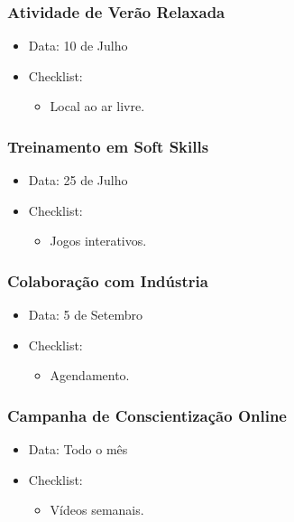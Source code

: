\documentclass[12pt]{article}
\begin{document}
\subsubsection{Atividade de Verão Relaxada}
\begin{itemize}
    \item Data: 10 de Julho
    \item Checklist:
      \begin{itemize}
        \item Local ao ar livre.
      \end{itemize}
\end{itemize}

\subsubsection{Treinamento em Soft Skills}
\begin{itemize}
    \item Data: 25 de Julho
    \item Checklist:
      \begin{itemize}
        \item Jogos interativos.
      \end{itemize}
\end{itemize}

\subsubsection{Colaboração com Indústria}
\begin{itemize}
    \item Data: 5 de Setembro
    \item Checklist:
      \begin{itemize}
        \item Agendamento.
      \end{itemize}
\end{itemize}

\subsubsection{Campanha de Conscientização Online}
\begin{itemize}
    \item Data: Todo o mês
    \item Checklist:
      \begin{itemize}
        \item Vídeos semanais.
      \end{itemize}
\end{itemize}
\end{document}
